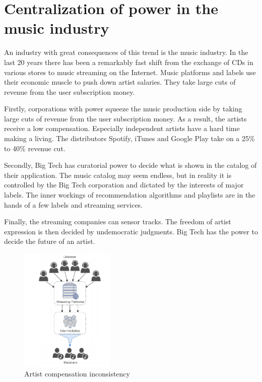 \section{Centralization of power in the music industry}
An industry with great consequences of this trend is the music industry. In the last 20 years there has been a remarkably fast shift from the exchange of CDs in various stores to music streaming on the Internet. Music platforms and labels use their economic muscle to push down artist salaries. They take large cuts of revenue from the user subscription money.

Firstly, corporations with power squeeze the music production side by taking large cuts of revenue from the user subscription money. As a result, the artists receive a low compensation. Especially independent artists have a hard time making a living. The distributors Spotify, iTunes and Google Play take on a 25\% to 40\% revenue cut.

Secondly, Big Tech has curatorial power to decide what is shown in the catalog of their application. The music catalog may seem endless, but in reality it is controlled by the Big Tech corporation and dictated by the interests of major labels. The inner workings of recommendation algorithms and playlists are in the hands of a few labels and streaming services.

Finally, the streaming companies can sensor tracks. The freedom of artist expression is then decided by undemocratic judgments. Big Tech has the power to decide the future of an artist.

\begin{figure}
    \centering
	\includegraphics[width=0.4\textwidth]{introduction/problem-image.png}
	\caption{Artist compensation inconsistency}
\end{figure}

